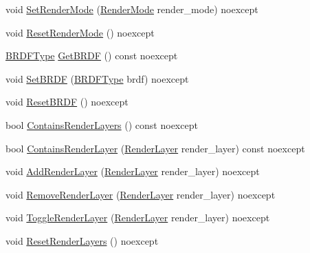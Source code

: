 \begin{DoxyCompactItemize}
\item 
void \hyperlink{classmage_1_1rendering_1_1_camera_settings_aa4f29b081141c0acfb0e4d92eac81602}{Set\+Render\+Mode} (\hyperlink{namespacemage_1_1rendering_aeb14ce7610cc9391f4e01be027b91dcc}{Render\+Mode} render\+\_\+mode) noexcept
\item 
void \hyperlink{classmage_1_1rendering_1_1_camera_settings_a1f8e364760855a786743890f0eb22e96}{Reset\+Render\+Mode} () noexcept
\item 
\hyperlink{namespacemage_1_1rendering_a13c5e70586af4ce254146074ec055bf6}{B\+R\+D\+F\+Type} \hyperlink{classmage_1_1rendering_1_1_camera_settings_a0339c90a08f8f556a8d82b1b6992e2bb}{Get\+B\+R\+DF} () const noexcept
\item 
void \hyperlink{classmage_1_1rendering_1_1_camera_settings_ab764e8cf2295c635d842df609a87a7f1}{Set\+B\+R\+DF} (\hyperlink{namespacemage_1_1rendering_a13c5e70586af4ce254146074ec055bf6}{B\+R\+D\+F\+Type} brdf) noexcept
\item 
void \hyperlink{classmage_1_1rendering_1_1_camera_settings_a0f807e646ebdcd6514a89a087f476781}{Reset\+B\+R\+DF} () noexcept
\item 
bool \hyperlink{classmage_1_1rendering_1_1_camera_settings_aa6a33e3b5936e440af32d2ca3d65585f}{Contains\+Render\+Layers} () const noexcept
\item 
bool \hyperlink{classmage_1_1rendering_1_1_camera_settings_aab59f8b20a5d05fd23fff006ef741dac}{Contains\+Render\+Layer} (\hyperlink{namespacemage_1_1rendering_a466c2a441ea5b26e4625c2f34e021b3d}{Render\+Layer} render\+\_\+layer) const noexcept
\item 
void \hyperlink{classmage_1_1rendering_1_1_camera_settings_a921ff9ebe3ff05890f0e3dd8b71fcb7f}{Add\+Render\+Layer} (\hyperlink{namespacemage_1_1rendering_a466c2a441ea5b26e4625c2f34e021b3d}{Render\+Layer} render\+\_\+layer) noexcept
\item 
void \hyperlink{classmage_1_1rendering_1_1_camera_settings_a49c766f4880c798a90a9b8fe488a6711}{Remove\+Render\+Layer} (\hyperlink{namespacemage_1_1rendering_a466c2a441ea5b26e4625c2f34e021b3d}{Render\+Layer} render\+\_\+layer) noexcept
\item 
void \hyperlink{classmage_1_1rendering_1_1_camera_settings_a95c531aba7bbddba9ea47000de3c53b2}{Toggle\+Render\+Layer} (\hyperlink{namespacemage_1_1rendering_a466c2a441ea5b26e4625c2f34e021b3d}{Render\+Layer} render\+\_\+layer) noexcept
\item 
void \hyperlink{classmage_1_1rendering_1_1_camera_settings_a954a0af8d7939069e32b77abc23f95d0}{Reset\+Render\+Layers} () noexcept

\end{DoxyCompactItemize}
